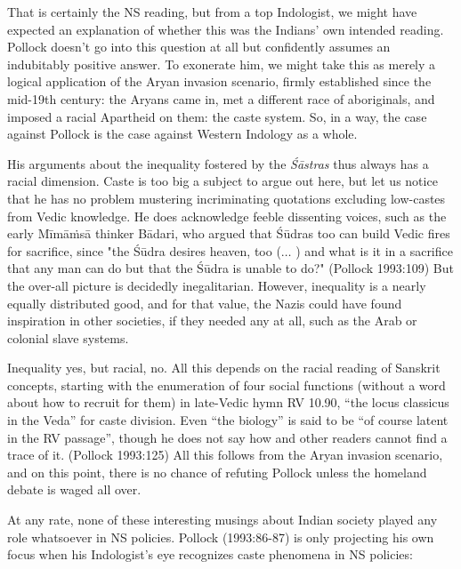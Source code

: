 That is certainly the NS reading, but from a top Indologist, we might have expected an explanation of whether this was the Indians’ own intended reading. Pollock doesn’t go into this question at all but confidently assumes an indubitably positive answer. To exonerate him, we might take this as merely a logical application of the Aryan invasion scenario, firmly established since the mid-19th century: the Aryans came in, met a different race of aboriginals, and imposed a racial Apartheid on them: the caste system. So, in a way, the case against Pollock is the case against Western Indology as a whole.

His arguments about the inequality fostered by the {\sl Śāstras} thus always has a racial dimension. Caste is too big a subject to argue out here, but let us notice that he has no problem mustering incriminating quotations excluding low-castes from Vedic knowledge. He does acknowledge feeble dissenting voices, such as the early Mīmāṁsā thinker Bādari, who argued that Śūdras too can build Vedic fires for sacrifice, since "the Śūdra desires heaven, too ($\ldots$ ) and what is it in a sacrifice that any man can do but that the Śūdra is unable to do?" (Pollock 1993:109) But the over-all picture is decidedly inegalitarian. However, inequality is a nearly equally distributed good, and for that value, the Nazis could have found inspiration in other societies, if they needed any at all, such as the Arab or colonial slave systems.

Inequality yes, but racial, no. All this depends on the racial reading of Sanskrit concepts, starting with the enumeration of four social functions (without a word about how to recruit for them) in late-Vedic hymn RV 10.90, “the locus classicus in the Veda” for caste division. Even “the biology” is said to be “of course latent in the RV passage”, though he does not say how and other readers cannot find a trace of it. (Pollock 1993:125) All this follows from the Aryan invasion scenario, and on this point, there is no chance of refuting Pollock unless the homeland debate is waged all over. 

At any rate, none of these interesting musings about Indian society played any role whatsoever in NS policies. Pollock (1993:86-87) is only projecting his own focus when his Indologist’s eye recognizes caste phenomena in NS policies: 
\medskip

